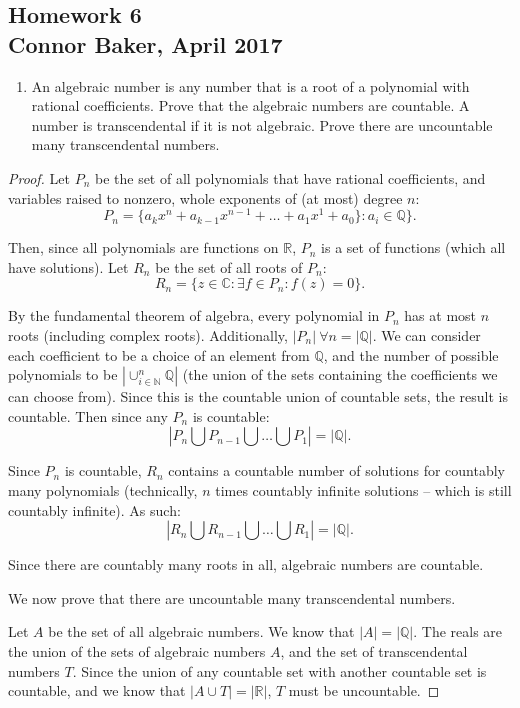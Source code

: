 \documentclass[10pt]{article}
\theoremstyle{definition}
\theoremstyle{plain}
\newcommand{\N}{\mathbb{N}}
\newcommand{\Q}{\mathbb{Q}}
\newcommand{\R}{\mathbb{R}}
\newcommand{\C}{\mathbb{C}}
\begin{document}

\begin{center}
  \subsection*{Homework 6\\Connor Baker, April 2017}
\end{center}

\begin{enumerate}
\item An algebraic number is any number that is a root of a polynomial with rational coefficients.  Prove that the algebraic numbers are countable.  A number is transcendental if it is not algebraic.  Prove there are uncountable many transcendental numbers.
\end{enumerate}

\begin{proof}
  Let $P_n$ be the set of all polynomials that have rational coefficients, and variables raised to nonzero, whole exponents of (at most) degree $n$:
  $$P_n = \{a_k x^n + a_{k-1} x^{n-1} + \dots + a_1 x^1 + a_0\}: a_i \in\Q\}.$$

  Then, since all polynomials are functions on $\R$, $P_n$ is a set of functions (which all have solutions). Let $R_n$ be the set of all roots of $P_n$:
  $$R_n= \{z\in\C: \exists f\in P_n: f(z)= 0\}.$$

  By the fundamental theorem of algebra, every polynomial in $P_n$ has at most $n$ roots (including complex roots). Additionally, $|P_n|\ \forall n = |\Q|$. We can consider each coefficient to be a choice of an element from $\Q$, and the number of possible polynomials to be $|\cup_{i\in\N}^n \Q|$ (the union of the sets containing the coefficients we can choose from). Since this is the countable union of countable sets, the result is countable. Then since any $P_n$ is countable:
  $$\left| P_n \bigcup P_{n-1} \bigcup \dots \bigcup P_1 \right|= |\Q|.$$

  Since $P_n$ is countable, $R_n$ contains a countable number of solutions for countably many polynomials (technically, $n$ times countably infinite solutions -- which is still countably infinite). As such:
  $$\left| R_n \bigcup R_{n-1} \bigcup \dots \bigcup R_1 \right|= |\Q|.$$

  Since there are countably many roots in all, algebraic numbers are countable.

  We now prove that there are uncountable many transcendental numbers.

  Let $A$ be the set of all algebraic numbers. We know that $|A| = |\Q|$. The reals are the union of the sets of algebraic numbers $A$, and the set of transcendental numbers $T$. Since the union of any countable set with another countable set is countable, and we know that $|A\cup T| = |\R|$, $T$ must be uncountable.
\end{proof}
\end{document}
